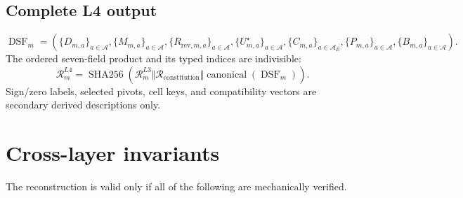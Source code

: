 \documentclass[11pt,oneside]{article}
\newcommand{\sha}{\operatorname{SHA256}}
\newcommand{\Atoms}{\mathcal{A}}
\newcommand{\DSF}{\operatorname{DSF}}
\begin{document}
\subsection{Complete L4 output}

\[
  \DSF_m=
  \left(
    \{D_{m,a}\}_{a\in\Atoms},
    \{M_{m,a}\}_{a\in\Atoms},
    \{R_{\mathrm{rev},m,a}\}_{a\in\Atoms},
    \{U^\star_{m,a}\}_{a\in\Atoms},
    \{C_{m,a}\}_{a\in\Atoms_E},
    \{P_{m,a}\}_{a\in\Atoms},
    \{B_{m,a}\}_{a\in\Atoms}
  \right).
\]
The ordered seven-field product and its typed indices are indivisible:
\[
  \mathcal{R}^{L4}_m
  =
  \sha\!\left(
    \mathcal{R}^{L3}_m
    \Vert\mathcal{R}_{\mathrm{constitution}}
    \Vert\operatorname{canonical}(\DSF_m)
  \right).
\]
Sign/zero labels, selected pivots, cell keys, and compatibility vectors are
secondary derived descriptions only.

\section{Cross-layer invariants}

The reconstruction is valid only if all of the following are mechanically
verified.
\end{document}
